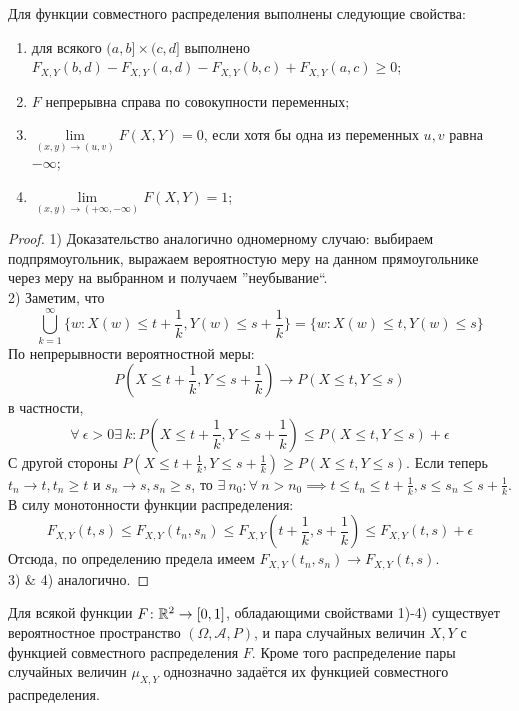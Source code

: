 \begin{proposal}
    Для функции совместного распределения выполнены следующие свойства:
    \begin{enumerate}
        \item для всякого $(a, b] \times (c,d]$ выполнено $F_{X,Y}(b, d) - F_{X,Y}(a, d) - F_{X,Y}(b, c) + F_{X,Y}(a, c) \geq 0$;
        \item $F$ непрерывна справа по совокупности переменных;
        \item $\lim\limits_{(x, y) \to (u, v)} F(X, Y) = 0$, если хотя бы одна из переменных $u, v$ равна $-\infty$;
        \item $\lim\limits_{(x, y) \to (+\infty, -\infty)} F(X, Y) = 1$;
    \end{enumerate}
\end{proposal}
\begin{proof}
    1) Доказательство аналогично одномерному случаю: выбираем подпрямоугольник, выражаем вероятностую меру на данном
    прямоугольнике через меру на выбранном и получаем ''неубывание``.\\
    2) Заметим, что
    \[
        \bigcup_{k = 1}^{\infty} \{w \colon X(w) \leq t + \frac{1}{k}, Y(w) \leq s + \frac{1}{k}\}
        = \{w \colon X(w) \leq t, Y(w) \leq s\}
    \]
    По непрерывности вероятностной меры:
    \[
        P\left(X \leq t + \frac{1}{k}, Y \leq s + \frac{1}{k}\right) \to
        P(X \leq t, Y \leq s)
    \]
    в частности,
    \[
        \forall ~ \epsilon > 0 \exists ~ k \colon P\left( X \leq t + \frac{1}{k}, Y \leq s + \frac{1}{k} \right)
        \leq P(X \leq t, Y \leq s) + \epsilon
    \]
    С другой стороны $P\left( X \leq t + \frac{1}{k}, Y \leq s + \frac{1}{k} \right) \geq P(X \leq t, Y \leq s)$.
    Если теперь $t_n \to t, t_n \geq t$ и $s_n \to s, s_n \geq s$, то $\exists ~ n_0 \colon \forall ~ n > n_0
    \implies t \leq t_n \leq t + \frac{1}{k}, s \leq s_n \leq s + \frac{1}{k}$. В силу монотонности функции
    распределения:
    \[
        F_{X, Y}(t, s) \leq F_{X, Y}(t_n, s_n) \leq F_{X, Y}\left( t + \frac{1}{k}, s + \frac{1}{k} \right)
        \leq F_{X, Y}(t, s) + \epsilon
    \]
    Отсюда, по определению предела имеем $F_{X, Y}(t_n, s_n) \to F_{X, Y}(t, s)$.\\
    3) \& 4) аналогично.
\end{proof}
\begin{theorem}
    Для всякой функции $F \colon \mathbb{R}^2 \to [0, 1]$, обладающими свойствами 1)-4) существует вероятностное пространство
    $(\Omega, \mathcal{A}, P)$, и пара случайных величин $X, Y$ с функцией совместного распределения $F$. Кроме того
    распределение пары случайных величин $\mu_{X, Y}$ однозначно задаётся их функцией совместного распределения.
\end{theorem}

